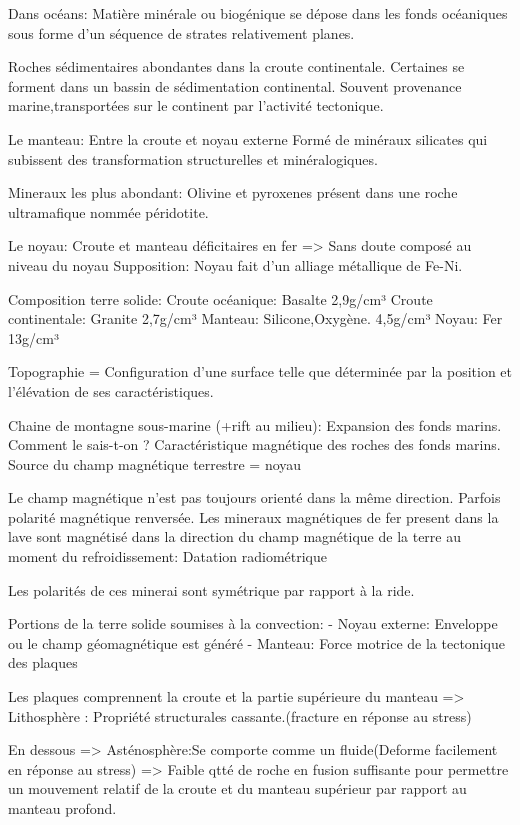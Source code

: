 Dans océans: Matière minérale ou biogénique se dépose dans les fonds océaniques sous forme d’un séquence de strates relativement planes.


Roches sédimentaires abondantes dans la croute continentale.
Certaines se forment dans un bassin de sédimentation continental.
Souvent provenance marine,transportées sur le continent par l’activité tectonique.






Le manteau:
Entre la croute et noyau externe
Formé de minéraux silicates qui subissent des transformation structurelles et minéralogiques.


Mineraux les plus abondant: Olivine et pyroxenes présent dans une roche ultramafique nommée péridotite.


Le noyau:
Croute et manteau déficitaires en fer => Sans doute composé au niveau du noyau
Supposition: Noyau fait d’un alliage métallique de Fe-Ni.


Composition terre solide:
Croute océanique:
Basalte
2,9g/cm³
Croute continentale:
Granite
2,7g/cm³
Manteau:
Silicone,Oxygène.
4,5g/cm³
Noyau:
Fer
13g/cm³




Topographie = Configuration d’une surface telle que déterminée par la position et l’élévation de ses caractéristiques.


Chaine de montagne sous-marine (+rift au milieu): Expansion des fonds marins.
Comment le sais-t-on ?
Caractéristique magnétique des roches des fonds marins.
Source du champ magnétique terrestre = noyau


Le champ magnétique n’est pas toujours orienté dans la même direction. Parfois polarité magnétique renversée.
Les mineraux magnétiques de fer present dans la lave sont magnétisé dans la direction du champ magnétique de la terre au moment du refroidissement: Datation radiométrique


Les polarités de ces minerai sont symétrique par rapport à la ride.




Portions de la terre solide soumises à la convection:
- Noyau externe: Enveloppe ou le champ géomagnétique est généré
- Manteau: Force motrice de la tectonique des plaques


Les plaques comprennent la croute et la partie supérieure du manteau
=> Lithosphère : Propriété structurales cassante.(fracture en réponse au stress)


En dessous => Asténosphère:Se comporte comme un fluide(Deforme facilement en réponse au stress)
=> Faible qtté de roche en fusion suffisante pour permettre un mouvement relatif de la croute et du manteau supérieur par rapport au manteau profond.




